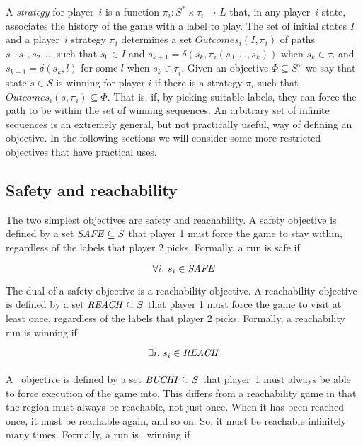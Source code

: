 A \emph{strategy} for player~$i$ is a function $\pi_i : S^* \times \tau_i \rightarrow L$ that, in any player~$i$ state, associates the history of the game with a label to play. The set of initial states $I$ and a player~$i$ strategy $\pi_i$ determines a set $Outcomes_i(I, \pi_i)$ of paths $s_0, s_1, s_2, \ldots $ such that $s_0 \in I$ and $s_{k+1} = \delta(s_k, \pi_i(s_0,\ldots,s_k))$ when $s_k \in \tau_i$ and $s_{k+1} = \delta(s_k, l)$ for some $l$ when $s_k \in \tau_{\overline{i}}$.  Given an objective $\Phi \subseteq S^\omega$ we say that state $s \in S$ is winning for player $i$ if there is a strategy $\pi_i$ such that $Outcomes_i({s}, \pi_i) \subseteq \Phi$. That is, if, by picking suitable labels, they can force the path to be within the set of winning sequences. An arbitrary set of infinite sequences is an extremely general, but not practically useful, way of defining an objective. In the following sections we will consider some more restricted objectives that have practical uses.

\subsection{Safety and reachability}

The two simplest objectives are safety and reachability. A safety objective is defined by a set $\mathit{SAFE} \subseteq S$ that player 1 must force the game to stay within, regardless of the labels that player 2 picks. Formally, a run is safe if 

\begin{equation}
\label{eqn:safeobj}
\forall i.\ s_i \in \mathit{SAFE}
\end{equation}

The dual of a safety objective is a reachability objective. A reachability objective is defined by a set $\mathit{REACH} \subseteq S$ that player 1 must force the game to visit at least once, regardless of the labels that player 2 picks. Formally, a reachability run is winning if 

\begin{equation}
\label{eqn:reachobj}
\exists i.\ s_i \in \mathit{REACH}
\end{equation}

\paragraph{\buchi}
A \buchi\ objective is defined by a set $\mathit{BUCHI} \subseteq S$ that player~1 must always be able to force execution of the game into. This differs from a reachability game in that the region must always be reachable, not just once. When it has been reached once, it must be reachable again, and so on. So, it must be reachable infinitely many times. Formally, a run is \buchi\ winning if 

